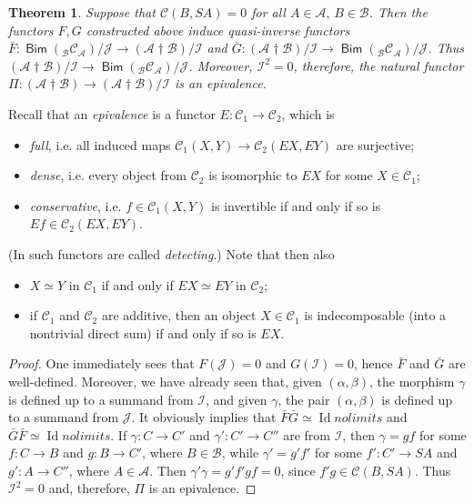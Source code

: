 \documentclass[12pt,a4paper]{amsart}
\newtheorem{theorem}{Theorem}[section]
\theoremstyle{definition}
\theoremstyle{remark}
\numberwithin{equation}{section}
\begin{document}
 \begin{theorem}\label{11}
 Suppose that ${\mathscr C}(B,SA)=0$ for all $A\in{\mathscr A},\,B\in{\mathscr B}$. Then
  the functors $F,G$ constructed above induce quasi-inverse functors
 $\bar F:{\mathop\mathsf{Bim}\nolimits}({{_{\mathscr B}}{\mathscr C}_{\mathscr A}})/{\mathscr J}\to({\mathscr A}{\dagger}{\mathscr B})/{\mathscr I}$ and $\bar G:({\mathscr A}{\dagger}{\mathscr B})/{\mathscr I}\to{\mathop\mathsf{Bim}\nolimits}({{_{\mathscr B}}{\mathscr C}_{\mathscr A}})/{\mathscr J}$.
 Thus $({\mathscr A}{\dagger}{\mathscr B})/{\mathscr I}\to{\mathop\mathsf{Bim}\nolimits}({{_{\mathscr B}}{\mathscr C}_{\mathscr A}})/{\mathscr J}$. Moreover, ${\mathscr I}^2=0$, therefore, the natural
 functor $\Pi:({\mathscr A}{\dagger}{\mathscr B})\to({\mathscr A}{\dagger}{\mathscr B})/{\mathscr I}$ is an epivalence.
 \end{theorem}

 Recall that an \emph{epivalence} is a functor $E:{\mathscr C}_1\to{\mathscr C}_2$, which is
 \begin{itemize}
\item  \emph{full}, i.e. all induced maps ${\mathscr C}_1(X,Y)\to{\mathscr C}_2(EX,EY)$ are surjective;
 \item  \emph{dense}, i.e. every object from ${\mathscr C}_2$ is isomorphic to $EX$ for some $X\in{\mathscr C}_1$;
 \item  \emph{conservative}, i.e. $f\in{\mathscr C}_1(X,Y)$ is invertible {if and only if } so is $Ef\in{\mathscr C}_2(EX,EY)$.
\end{itemize}
 (In \cite{ba1} such functors are called \emph{detecting}.)
 Note that then also
 \begin{itemize}
  \item  $X\simeq Y$ in ${\mathscr C}_1$ {if and only if } $EX\simeq EY$ in ${\mathscr C}_2$;
\item  if ${\mathscr C}_1$ and ${\mathscr C}_2$ are additive, then an object $X\in{\mathscr C}_1$ is indecomposable (into a
 nontrivial direct sum) {if and only if } so is $EX$.
\end{itemize}
 
 \begin{proof}
  One immediately sees that $F({\mathscr J})=0$ and $G({\mathscr I})=0$, hence $\bar F$ and $\bar G$ are well-defined.
 Moreover, we have already seen that, given $({\alpha},{\beta})$, the morphism ${\gamma}$ is defined up to a summand
 from ${\mathscr I}$, and given ${\gamma}$, the pair $({\alpha},{\beta})$ is defined up to a summand from ${\mathscr J}$. It
 obviously implies that $\bar F\bar G\simeq{\mathop\mathrm{Id}nolimits}$ and $\bar G\bar F\simeq{\mathop\mathrm{Id}nolimits}$. If ${\gamma}:C\to C'$ and
 ${\gamma}':C'\to C''$ are from ${\mathscr I}$, then ${\gamma}=gf$ for some $f:C\to  B$ and $g:B\to C'$, where
 $B\in{\mathscr B}$, while ${\gamma}'=g'f'$ for some $f':C'\to SA$ and $g':A\to C''$, where $A\in{\mathscr A}$.
 Then ${\gamma}'{\gamma}=g'f'gf=0$, since $f'g\in{\mathscr C}(B,SA)$. Thus ${\mathscr I}^2=0$ and, therefore,
 $\Pi$ is an epivalence.
 \end{proof} 
\end{document}
